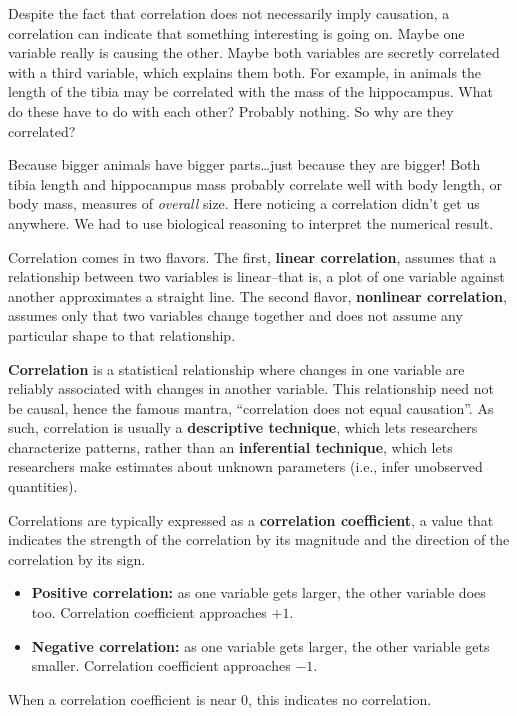 \documentclass[
  13,
  letterpaper,
]{report}
\begin{document}
Despite the fact that correlation does not necessarily imply causation,
a correlation can indicate that something interesting is going on. Maybe
one variable really is causing the other. Maybe both variables are
secretly correlated with a third variable, which explains them both. For
example, in animals the length of the tibia may be correlated with the
mass of the hippocampus. What do these have to do with each other?
Probably nothing. So why are they correlated?

Because bigger animals have bigger parts\ldots just because they are
bigger! Both tibia length and hippocampus mass probably correlate well
with body length, or body mass, measures of \emph{overall} size. Here
noticing a correlation didn't get us anywhere. We had to use biological
reasoning to interpret the numerical result.

Correlation comes in two flavors. The first, \textbf{linear
correlation}, assumes that a relationship between two variables is
linear--that is, a plot of one variable against another approximates a
straight line. The second flavor, \textbf{nonlinear correlation},
assumes only that two variables change together and does not assume any
particular shape to that relationship.

\textbf{Correlation} is a statistical relationship where changes in one
variable are reliably associated with changes in another variable. This
relationship need not be causal, hence the famous mantra, ``correlation
does not equal causation''. As such, correlation is usually a
\textbf{descriptive technique}, which lets researchers characterize
patterns, rather than an \textbf{inferential technique}, which lets
researchers make estimates about unknown parameters (i.e., infer
unobserved quantities).

Correlations are typically expressed as a \textbf{correlation
coefficient}, a value that indicates the strength of the correlation by
its magnitude and the direction of the correlation by its sign.

\begin{itemize}
\item
  \textbf{Positive correlation:} as one variable gets larger, the other
  variable does too. Correlation coefficient approaches \(+1\).
\item
  \textbf{Negative correlation:} as one variable gets larger, the other
  variable gets smaller. Correlation coefficient approaches \(-1\).
\end{itemize}

When a correlation coefficient is near 0, this indicates no correlation.
\end{document}
